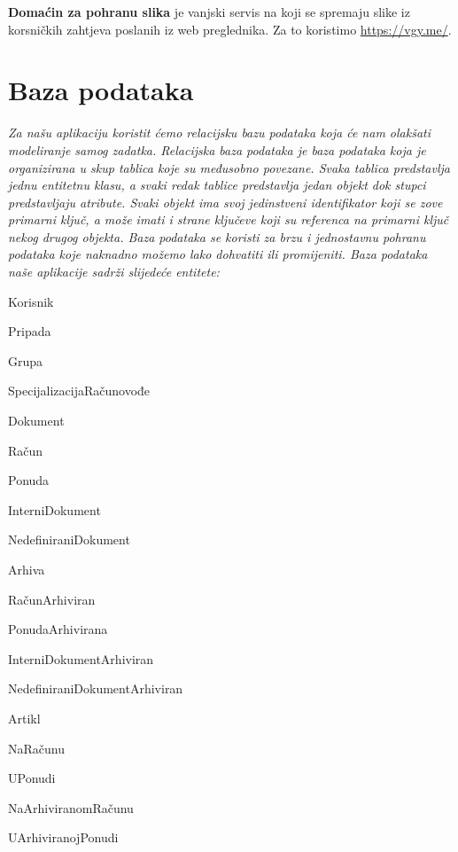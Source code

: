 		\textbf{Domaćin za pohranu slika} je vanjski servis na koji se spremaju slike iz korsničkih zahtjeva poslanih iz web preglednika. Za to koristimo \url{https://vgy.me/}.


				
		\section{Baza podataka}
			
			
		\textit{Za našu aplikaciju koristit ćemo relacijsku bazu podataka koja će nam olakšati modeliranje samog zadatka. 
		Relacijska baza podataka je baza podataka koja je organizirana u skup tablica koje su međusobno povezane. 
		Svaka tablica predstavlja jednu entitetnu klasu, a svaki redak tablice predstavlja jedan objekt dok stupci predstavljaju atribute. 
		Svaki objekt ima svoj jedinstveni identifikator koji se zove primarni ključ, a može imati i strane ključeve koji su referenca na primarni ključ nekog drugog objekta.
		Baza podataka se koristi za brzu i jednostavnu pohranu podataka koje naknadno možemo lako dohvatiti ili promijeniti.
		Baza podataka naše aplikacije sadrži slijedeće entitete: 
		}\\

		\begin{packed_item}
			\item  Korisnik
			\item  Pripada
			\item  Grupa
			\item  SpecijalizacijaRačunovođe
			\item  Dokument
			\item  Račun
			\item  Ponuda
			\item  InterniDokument
			\item  NedefiniraniDokument
			\item  Arhiva
			\item  RačunArhiviran
			\item  PonudaArhivirana
			\item  InterniDokumentArhiviran
			\item  NedefiniraniDokumentArhiviran
			\item  Artikl
			\item  NaRačunu
			\item  UPonudi
			\item  NaArhiviranomRačunu
			\item  UArhiviranojPonudi
		\end{packed_item}
		

